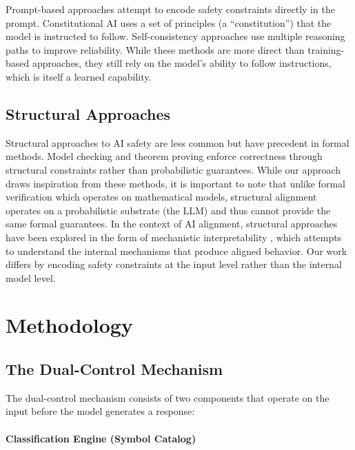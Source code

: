 \documentclass[11pt]{article}
\begin{document}
Prompt-based approaches attempt to encode safety constraints directly in the prompt. Constitutional AI \cite{bai2022} uses a set of principles (a ``constitution'') that the model is instructed to follow. Self-consistency approaches \cite{wang2022} use multiple reasoning paths to improve reliability. While these methods are more direct than training-based approaches, they still rely on the model's ability to follow instructions, which is itself a learned capability.

\subsection{Structural Approaches}

Structural approaches to AI safety are less common but have precedent in formal methods. Model checking \cite{clarke1999} and theorem proving \cite{gordon1979} enforce correctness through structural constraints rather than probabilistic guarantees. While our approach draws inspiration from these methods, it is important to note that unlike formal verification which operates on mathematical models, structural alignment operates on a probabilistic substrate (the LLM) and thus cannot provide the same formal guarantees. In the context of AI alignment, structural approaches have been explored in the form of mechanistic interpretability \cite{elhage2021}, which attempts to understand the internal mechanisms that produce aligned behavior. Our work differs by encoding safety constraints at the input level rather than the internal model level.

\section{Methodology}

\subsection{The Dual-Control Mechanism}

The dual-control mechanism consists of two components that operate on the input before the model generates a response:

\paragraph{Classification Engine (Symbol Catalog)}
\end{document}
